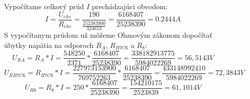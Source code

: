 \begin{figure}[!ht]
\begin{center}
    
    Vypočítame celkový prúd $I$ prechádzajúci obvodom:
    \[
        I = \frac{U_{ekv}}{R_{ekv}} = 
        \frac{190}{\frac{252383900}{324653}} = 
        \frac{6168407}{25238390} = 0.2444 A
    \]
    S vypočítanym prúdom už môžeme Ohmovým zákonom dopočítať úbytky napätia na odporoch $R_A$, $R_{B7C6}$ a $R_8$:
    \[
        U_{RA} = R_A * I = \frac{548250}{2371} * \frac{6168407}{25238390} = 
        \frac{338182913775}{5984022269} = 56,5143 V
    \]
    \[
        U_{RB7C6} = R_{B7C6} * I = \frac{227973153900}{769752263} * \frac{6168407}{25238390} = 
        \frac{433148992410}{5984022269} = 72,3843 V
    \]
    \[
        U_{R8} = R_8 * I = 250 * \frac{6168407}{25238390} = 
        \frac{154210175}{2523839} = 61,1014 V
    \]
\end{center}
\end{figure}

